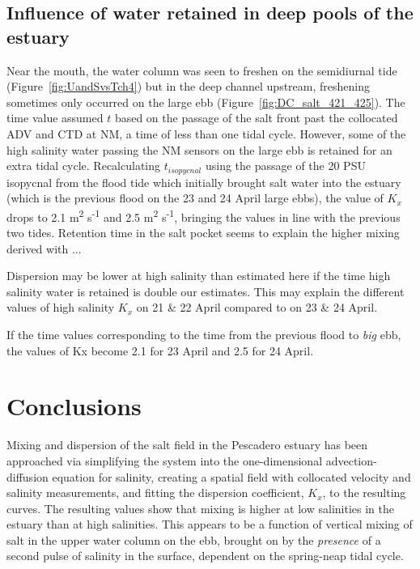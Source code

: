 \subsection{Influence of water retained in deep pools of the estuary}
Near the mouth, the water column was seen to freshen on the semidiurnal tide (Figure~\ref{fig:UandSvsTch4}) but in the deep channel upstream, freshening sometimes only occurred on the large ebb (Figure~\ref{fig:DC_salt_421_425}). The time value assumed $t$ based on the passage of the salt front past the collocated ADV and CTD at NM, a time of less than one tidal cycle. However, some of the high salinity water passing the NM sensors on the large ebb is retained for an extra tidal cycle. Recalculating $t_{isopycnal}$ using the passage of the 20 PSU isopycnal from the flood tide which initially brought salt water into the estuary (which is the previous flood on the 23 and 24 April large ebbs), the value of $K_x$ drops to 2.1 m\textsuperscript{2} s\textsuperscript{-1} and 2.5 m\textsuperscript{2} s\textsuperscript{-1}, bringing the values in line with the previous two tides. Retention time in the salt pocket seems to explain the higher mixing derived with ... 

Dispersion may be lower at high salinity than estimated here if the time high salinity water is retained is double our estimates. This may explain the different values of high salinity $K_x$ on 21 \& 22 April compared to on 23 \& 24 April. 

If the time values corresponding to the time from the previous flood to \emph{big} ebb, the values of Kx become 2.1 for 23 April and 2.5 for 24 April. 


\section{Conclusions}

Mixing and dispersion of the salt field in the Pescadero estuary has been approached via simplifying the system into the one-dimensional advection-diffusion equation for salinity, creating a spatial field with collocated velocity and salinity measurements, and fitting the dispersion coefficient, $K_x$, to the resulting curves. The resulting values show that mixing is higher at low salinities in the estuary than at high salinities. This appears to be a function of vertical mixing of salt in the upper water column on the ebb, brought on by the \emph{presence} of a second pulse of salinity in the surface, dependent on the spring-neap tidal cycle.  


